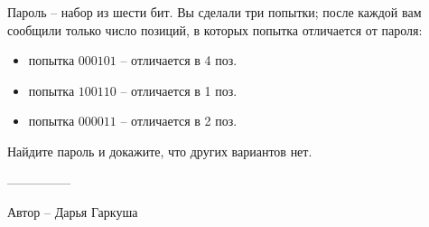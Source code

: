 \question
Пароль -- набор из шести бит. Вы сделали три попытки; после каждой вам сообщили только число позиций, в которых попытка отличается от пароля:
\begin{itemize}
    \item попытка $000101$ -- отличается в 4 поз.
    \item попытка $100110$ -- отличается в 1 поз.
    \item попытка $000011$ -- отличается в 2 поз.
\end{itemize}
Найдите пароль и докажите, что других вариантов нет.

---------------

Автор -- Дарья Гаркуша